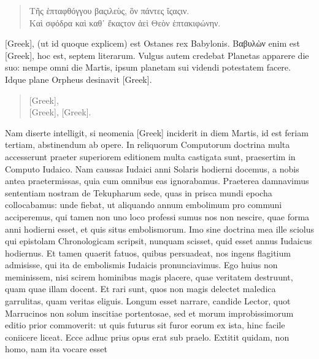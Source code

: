 \begin{quote}
\textgreek{Τῆς ἑπταφθόγγου βαςιλεὺς, ὃν πάντες ἴςαςιν.}\\
%
\textgreek{Καὶ σφόδρα καὶ καθ᾿ ἕκαςτον ἀεὶ Θεὸν ἑπτακιφώνην.}
\end{quote}
\textgreek{[Greek]}, (ut id quoque explicem) est Ostanes rex Babylonis.
\textgreek{Βαβυλὼν} enim est \textgreek{[Greek]},
 hoc est, septem literarum.
Vulgus autem credebat Planetas apparere die suo: nempe omni
die Martis, ipsum planetam sui videndi potestatem facere.
Idque plane Orpheus desinavit \textgreek{[Greek]}.
\begin{quote}
\textgreek{[Greek]},\\
\textgreek{[Greek]}, \textgreek{[Greek]}.
\end{quote}
Nam diserte intelligit, si neomenia
 \textgreek{[Greek]} inciderit in diem
Martis, id est feriam tertiam, abstinendum ab opere.
In reliquorum
Computorum doctrina multa accesserunt praeter superiorem editionem
multa castigata sunt, praesertim in Computo Iudaico.
Nam
caussas Iudaici anni Solaris hodierni docemus, a nobis antea praetermissas,
quia cum omnibus eas ignorabamus.
Praeterea damnavimus sententiam nostram de Tekupharum sede,
 quas in prisca
mundi epocha collocabamus: unde fiebat, ut aliquando annum
embolimum pro communi acciperemus, qui tamen non uno loco
professi sumus nos non nescire, quae forma anni hodierni esset, et
quis situs embolismorum.
Imo sine doctrina mea ille sciolus qui
epistolam Chronologicam scripsit, nunquam scisset, quid esset
annus Iudaicus hodiernus.
Et tamen quaerit fatuos, quibus persuadeat,
nos ingens flagitium admisisse, qui ita de embolismis Iudaicis
pronunciavimus.
Ego huius non meminissem, nisi scirem hominibus
magis placere, quae veritatem destruunt, quam quae illam docent.
Et rari sunt, quos non magis delectet maledica garrulitas,
quam veritas eliguis.
Longum esset narrare, candide Lector,
quot Marrucinos non solum inscitiae portentosae, sed et morum
improbissimorum editio prior commoverit: ut quis futurus sit furor
eorum ex ista, hinc facile coniicere liceat.
Ecce adhuc prius opus erat sub praelo.
Extitit quidam, non homo, nam ita vocare esset
